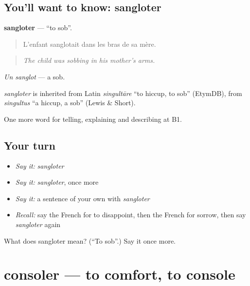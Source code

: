 \subsection*{You'll want to know: sangloter}
\textbf{sangloter} — \textquotedblleft{}to sob\textquotedblright{}.

\begin{quote}
L'enfant sanglotait dans les bras de sa mère.
\end{quote}

\begin{quote}
\emph{The child was sobbing in his mother's arms.}
\end{quote}

\emph{Un sanglot} — a sob.

\begin{cousinweb}
\emph{sangloter} is inherited from Latin \emph{singultāre} \textquotedblleft{}to hiccup, to sob\textquotedblright{} (EtymDB), from \emph{singultus} \textquotedblleft{}a hiccup, a sob\textquotedblright{} (Lewis \& Short).
\end{cousinweb}

\begin{grammarlens}[title={What you've built}]
One more word for telling, explaining and describing at B1.
\end{grammarlens}

\subsection*{Your turn}
\begin{itemize}
\raggedright
  \item \emph{Say it:} \emph{sangloter}
  \item \emph{Say it:} \emph{sangloter}, once more
  \item \emph{Say it:} a sentence of your own with \emph{sangloter}
  \item \emph{Recall:} say the French for to disappoint, then the French for sorrow, then say \emph{sangloter} again
\end{itemize}

\begin{tcolorbox}[breakable,colback=teal!4,colframe=teal!35!black,title={Before you move on}]
What does sangloter mean? (\textquotedblleft{}To sob\textquotedblright{}.) Say it once more.
\end{tcolorbox}
\section[consoler]{consoler — to comfort, to console}

